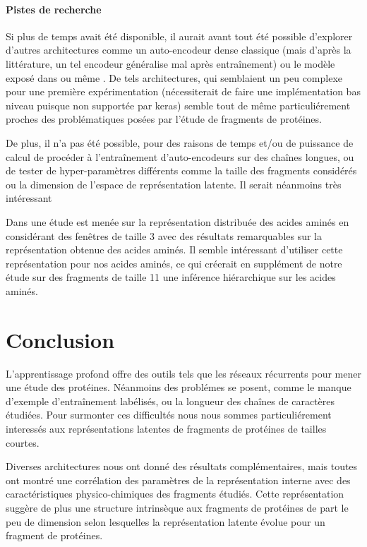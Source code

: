 \documentclass[a4paper, 11pt, onecolumn]{article}
\begin{document}
\paragraph{Pistes de recherche}

Si plus de temps avait été disponible, il aurait avant tout été possible
d'explorer d'autres architectures comme un auto-encodeur dense classique (mais
d'après la littérature, un tel encodeur généralise mal après entraînement) ou
le modèle exposé dans \cite{DBLP:journals/corr/ChoMGBSB14} ou même
\cite{bahdanau2014neural}. De tels architectures, qui semblaient un peu complexe
pour une première expérimentation (nécessiterait de faire une implémentation bas
niveau puisque non supportée par keras) semble tout de même particuliérement
proches des problématiques posées par l'étude de fragments de protéines.

De plus, il n'a pas été possible, pour des raisons de temps et/ou de puissance
de calcul de procéder à l'entraînement d'auto-encodeurs sur des chaînes longues,
ou de tester de hyper-paramètres différents comme la taille des fragments
considérés ou la dimension de l'espace de représentation latente. Il serait
néanmoins très intéressant

Dans \cite{asgari2015continuous} une étude est menée sur la représentation distribuée
des acides aminés en considérant des fenêtres de taille 3 avec des résultats
remarquables sur la représentation obtenue des acides aminés. Il semble
intéressant d'utiliser cette représentation pour nos acides aminés, ce qui
créerait en supplément de notre étude sur des fragments de taille 11 une
inférence hiérarchique sur les acides aminés.

\section*{Conclusion}

L'apprentissage profond offre des outils tels que les réseaux récurrents pour
mener une étude des protéines. Néanmoins des problémes se posent, comme le
manque d'exemple d'entraînement labélisés, ou la longueur des chaînes de
caractères étudiées.  Pour surmonter ces difficultés nous nous
sommes particuliérement interessés aux représentations latentes de fragments de
protéines de tailles courtes. 

Diverses architectures nous ont donné des
résultats complémentaires, mais toutes ont montré une corrélation des paramètres
de la représentation interne avec des caractéristiques physico-chimiques des
fragments étudiés. Cette représentation suggère de plus une structure
intrinsèque aux fragments de protéines de part le peu de dimension selon
lesquelles la représentation latente évolue pour un fragment de protéines.
\end{document}
